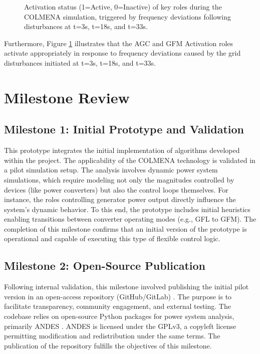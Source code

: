 \documentclass{article}
\begin{document}
\begin{figure}[h!]
    \caption{Activation status (1=Active, 0=Inactive) of key roles during the COLMENA simulation, triggered by frequency deviations following disturbances at t=3s, t=18s, and t=33s.}
    \label{fig:activation_plots}
\end{figure}
    
Furthermore, Figure \ref{fig:activation_plots} illustrates that the AGC and GFM Activation roles activate appropriately in response to frequency deviations caused by the grid disturbances initiated at t=3s, t=18s, and t=33s.

\section{Milestone Review}

\subsection*{Milestone 1: Initial Prototype and Validation}

This prototype integrates the initial implementation of algorithms developed within the project. The applicability of the COLMENA technology is validated in a pilot simulation setup. The analysis involves dynamic power system simulations, which require modeling not only the magnitudes controlled by devices (like power converters) but also the control loops themselves. For instance, the roles controlling generator power output directly influence the system's dynamic behavior. To this end, the prototype includes initial heuristics enabling transitions between converter operating modes (e.g., GFL to GFM). The completion of this milestone confirms that an initial version of the prototype is operational and capable of executing this type of flexible control logic.

\subsection*{Milestone 2: Open-Source Publication}

Following internal validation, this milestone involved publishing the initial pilot version in an open-access repository (GitHub/GitLab) \cite{git:eroots}. The purpose is to facilitate transparency, community engagement, and external testing. The codebase relies on open-source Python packages for power system analysis, primarily ANDES \cite{article:andes}. ANDES is licensed under the GPLv3, a copyleft license permitting modification and redistribution under the same terms. The publication of the repository fulfills the objectives of this milestone.
\end{document}
